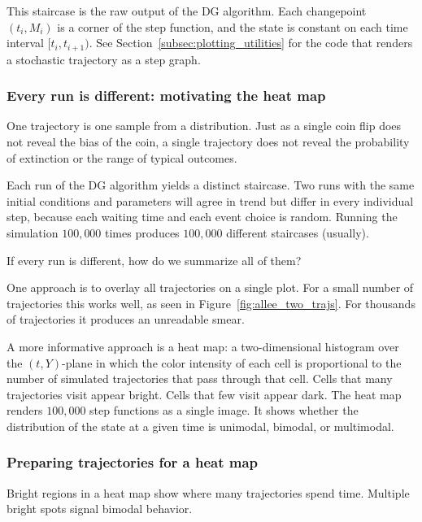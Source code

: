 This staircase is the raw output of the DG algorithm. Each changepoint $(t_i, M_i)$ is a corner of the step function, and the state is constant on each time interval $[t_i, t_{i+1})$. See Section~\ref{subsec:plotting_utilities} for the code that renders a stochastic trajectory as a step graph.

\subsubsection{Every run is different: motivating the heat map}\label{subsubsec:motivating_heatmap}

One trajectory is one sample from a distribution. Just as a single coin flip does not reveal the bias of the coin, a single trajectory does not reveal the probability of extinction or the range of typical outcomes.

Each run of the DG algorithm yields a distinct staircase. Two runs with the same initial conditions and parameters will agree in trend but differ in every individual step, because each waiting time and each event choice is random. Running the simulation $100{,}000$ times produces $100{,}000$ different staircases (usually).

If every run is different, how do we summarize all of them?

One approach is to overlay all trajectories on a single plot. For a small number of trajectories this works well, as seen in Figure~\ref{fig:allee_two_trajs}. For thousands of trajectories it produces an unreadable smear.

A more informative approach is a heat map: a two-dimensional histogram over the $(t, Y)$-plane in which the color intensity of each cell is proportional to the number of simulated trajectories that pass through that cell. Cells that many trajectories visit appear bright. Cells that few visit appear dark. The heat map renders $100{,}000$ step functions as a single image. It shows whether the distribution of the state at a given time is unimodal, bimodal, or multimodal.

\subsubsection{Preparing trajectories for a heat map}\label{subsubsec:prep_heatmap}

Bright regions in a heat map show where many trajectories spend time. Multiple bright spots signal bimodal behavior.

